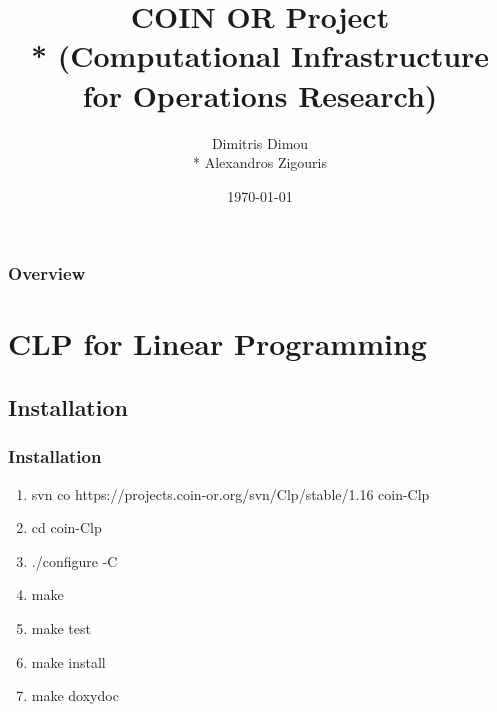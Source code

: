 \documentclass{beamer}
\title[COIN OR]{COIN OR Project \\* (Computational Infrastructure for Operations Research)} %
\author{Dimitris Dimou \\* Alexandros Zigouris} %
\institute[UP] %
{
University of Patras \\ %
\medskip
\textit{mijuomij@gmail.com} %
}
\date{\today} %
\begin{document}
\begin{frame}
\titlepage %
\end{frame}

\begin{frame}
\frametitle{Overview} %
\tableofcontents %
\end{frame}


\section{CLP for Linear Programming} %


\subsection{Installation} %


\begin{frame}
  \frametitle{Installation}
  \begin{enumerate}
    \item svn co https://projects.coin-or.org/svn/Clp/stable/1.16 coin-Clp
    \item cd coin-Clp
    \item ./configure -C
    \item make 
    \item make test
    \item make install
    \item make doxydoc
  \end{enumerate}
\end{frame}
\end{document}
